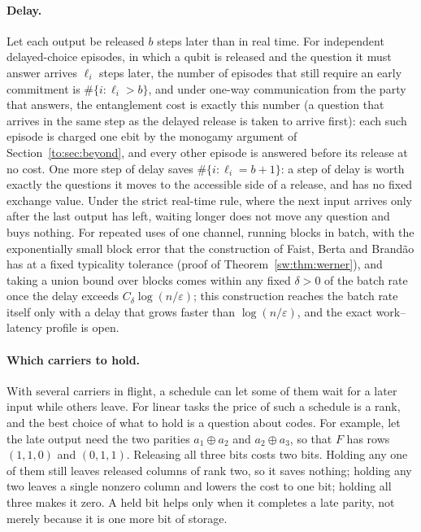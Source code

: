 \paragraph{Delay.} Let each output be released $b$ steps later than in real time. For independent delayed-choice episodes, in which a qubit is released and the question it must answer arrives $\ell_i$ steps later, the number of episodes that still require an early commitment is $\#\{i:\ell_i>b\}$, and under one-way communication from the party that answers, the entanglement cost is exactly this number (a question that arrives in the same step as the delayed release is taken to arrive first): each such episode is charged one ebit by the monogamy argument of Section~\ref{to:sec:beyond}, and every other episode is answered before its release at no cost. One more step of delay saves $\#\{i:\ell_i=b+1\}$: a step of delay is worth exactly the questions it moves to the accessible side of a release, and has no fixed exchange value. Under the strict real-time rule, where the next input arrives only after the last output has left, waiting longer does not move any question and buys nothing. For repeated uses of one channel, running blocks in batch, with the exponentially small block error that the construction of Faist, Berta and Brand\~ao has at a fixed typicality tolerance (proof of Theorem~\ref{sw:thm:werner}), and taking a union bound over blocks comes within any fixed $\delta>0$ of the batch rate once the delay exceeds $C_\delta\log(n/\varepsilon)$; this construction reaches the batch rate itself only with a delay that grows faster than $\log(n/\varepsilon)$, and the exact work--latency profile is open.

\paragraph{Which carriers to hold.} With several carriers in flight, a schedule can let some of them wait for a later input while others leave. For linear tasks the price of such a schedule is a rank, and the best choice of what to hold is a question about codes. For example, let the late output need the two parities $a_1\oplus a_2$ and $a_2\oplus a_3$, so that $F$ has rows $(1,1,0)$ and $(0,1,1)$. Releasing all three bits costs two bits. Holding any one of them still leaves released columns of rank two, so it saves nothing; holding any two leaves a single nonzero column and lowers the cost to one bit; holding all three makes it zero. A held bit helps only when it completes a late parity, not merely because it is one more bit of storage.

